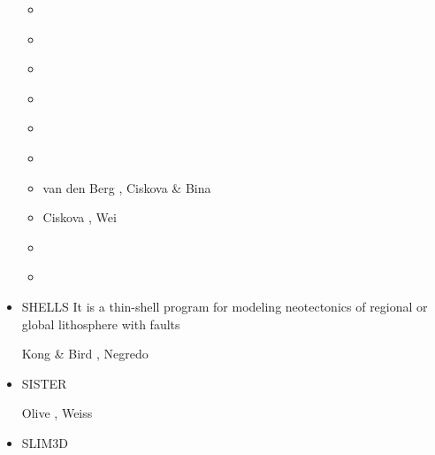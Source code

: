 \begin{itemize}
\begin{scriptsize}
\begin{itemize}
\item[\twothousandnine] \cite{vavl09}\cite{vavv09}
\item[\twothousandten] \cite{vahy10}\cite{syva10}\cite{devv10}\cite{vady10}\cite{vayb10}
\item[\twothousandeleven] \cite{vahs11}\cite{java11}\cite{vayj11}
\item[\twothousandtwelve] \cite{besy12}\cite{beva12}\cite{chgv12}\cite{vakn12}
\item[\twothousandthirteen] \cite{ancv13}\cite{cibi13}
\item[\twothousandfourteen] \cite{chsg14}\cite{mova14}\cite{chsv14}
\item[\twothousandfifteen] van den Berg \etal \cite{vasy15}, Ciskova \& Bina \cite{cibi15}
\item[\twothousandseventeen] Ciskova \etal \cite{civj17}, Wei \etal \cite{wewv17}
\item[\twothousandeighteen] \cite{spcv18}\cite{chss18}
\item[\twothousandnineteen] \cite{zhdv19}\cite{vayu19}\cite{casv19}\cite{vaws19}\cite{cibi19}
\end{itemize}
\end{scriptsize}

\item {\codefont SHELLS} 
It is a thin-shell program for modeling neotectonics of
regional or global lithosphere with faults

\begin{scriptsize}
Kong \& Bird \cite{kobi95}, Negredo \etal \cite{nebs02}
\end{scriptsize}

\item {\codefont SISTER} 

\begin{scriptsize}
Olive \etal \cite{olbm16}, Weiss \etal \cite{weib18}
\end{scriptsize}

\item {\codefont SLIM3D} 


\end{itemize}
